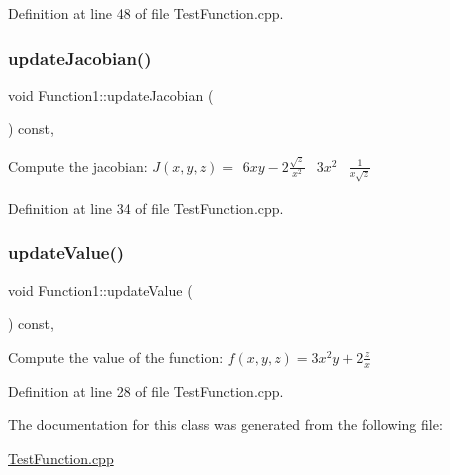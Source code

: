 Definition at line 48 of file Test\+Function.\+cpp.

\hypertarget{classFunction1_aff45595ff1b5fb4108e5313b31d3d774}{}\label{classFunction1_aff45595ff1b5fb4108e5313b31d3d774} 
\subsubsection{\texorpdfstring{update\+Jacobian()}{updateJacobian()}}
{\footnotesize\ttfamily void Function1\+::update\+Jacobian (\begin{DoxyParamCaption}{ }\end{DoxyParamCaption}) const\hspace{0.3cm}{\ttfamily [inline]}, {\ttfamily [protected]}}

Compute the jacobian\+: $J(x,y,z) = \begin{array}{lcr} 6xy - 2 \frac{\sqrt{z}}{x^2} & 3x^2 & \frac{1}{x \sqrt{z}} \end{array} $ 

Definition at line 34 of file Test\+Function.\+cpp.

\hypertarget{classFunction1_a95bc8ed2b08882cda37512e8f13fcba1}{}\label{classFunction1_a95bc8ed2b08882cda37512e8f13fcba1} 
\subsubsection{\texorpdfstring{update\+Value()}{updateValue()}}
{\footnotesize\ttfamily void Function1\+::update\+Value (\begin{DoxyParamCaption}{ }\end{DoxyParamCaption}) const\hspace{0.3cm}{\ttfamily [inline]}, {\ttfamily [protected]}}

Compute the value of the function\+: $ f(x,y,z) = 3x^2y+2\frac{z}{x}$ 

Definition at line 28 of file Test\+Function.\+cpp.



The documentation for this class was generated from the following file\+:\begin{DoxyCompactItemize}
\item 
\hyperlink{TestFunction_8cpp}{Test\+Function.\+cpp}\end{DoxyCompactItemize}
